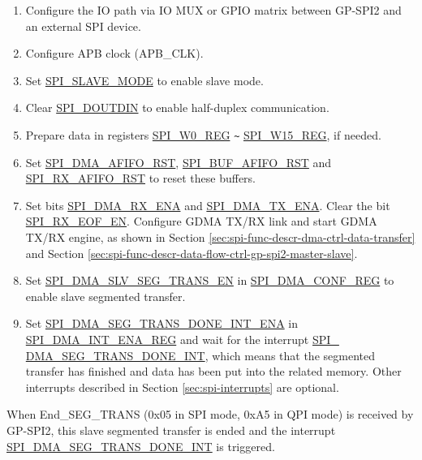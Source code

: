 \documentclass[main\_\_EN.tex]{subfiles}
\begin{document}
\begin{enumerate}
   \item  Configure the IO path via IO MUX or GPIO matrix between GP-SPI2 and an external SPI device.

   \item Configure APB clock (APB\_CLK).

    \item Set \hyperref[fielddesc:SPISLAVEMODE]{SPI\_SLAVE\_MODE} to enable slave mode.

    \item Clear \hyperref[fielddesc:SPIDOUTDIN]{SPI\_DOUTDIN} to enable half-duplex communication.

    \item Prepare data in registers \hyperref[regdesc:SPIW0REG]{SPI\_W0\_REG} \verb+~+ \hyperref[regdesc:SPIW15REG]{SPI\_W15\_REG}, if needed.

    \item Set \hyperref[fielddesc:SPIDMAAFIFORST]{SPI\_DMA\_AFIFO\_RST}, \hyperref[fielddesc:SPIBUFAFIFORST]{SPI\_BUF\_AFIFO\_RST} and \hyperref[fielddesc:SPIRXAFIFORST]{SPI\_RX\_AFIFO\_RST} to reset these buffers.

    \item Set bits \hyperref[fielddesc:SPIDMARXENA]{SPI\_DMA\_RX\_ENA} and \hyperref[fielddesc:SPIDMATXENA]{SPI\_DMA\_TX\_ENA}. Clear the bit \hyperref[fielddesc:SPIRXEOFEN]{SPI\_RX\_EOF\_EN}. Configure GDMA TX/RX link and start GDMA TX/RX engine, as shown in Section \ref{sec:spi-func-descr-dma-ctrl-data-transfer} and Section \ref{sec:spi-func-descr-data-flow-ctrl-gp-spi2-master-slave}.

    \item Set \hyperref[fielddesc:SPIDMASLVSEGTRANSEN]{SPI\_DMA\_SLV\_SEG\_TRANS\_EN} in \hyperref[regdesc:SPIDMACONFREG]{SPI\_DMA\_CONF\_REG} to enable slave segmented transfer.

    \item Set \hyperref[fielddesc:SPIDMASEGTRANSDONEINTENA]{SPI\_DMA\_SEG\_TRANS\_DONE\_INT\_ENA} in \hyperref[regdesc:SPIDMAINTENAREG]{SPI\_DMA\_INT\_ENA\_REG} and wait for the interrupt \hyperref[int:SPIDMASEGTRANSDONEINT]{SPI\_\\DMA\_SEG\_TRANS\_DONE\_INT}, which means that the segmented transfer has finished and data has been put into the related memory. Other interrupts described in Section \ref{sec:spi-interrupts} are optional.
\end{enumerate}

When End\_SEG\_TRANS (0x05 in SPI mode, 0xA5 in QPI mode) is received by GP-SPI2, this slave segmented transfer is ended and the interrupt \hyperref[int:SPIDMASEGTRANSDONEINT]{SPI\_DMA\_SEG\_TRANS\_DONE\_INT} is triggered.
\end{document}
